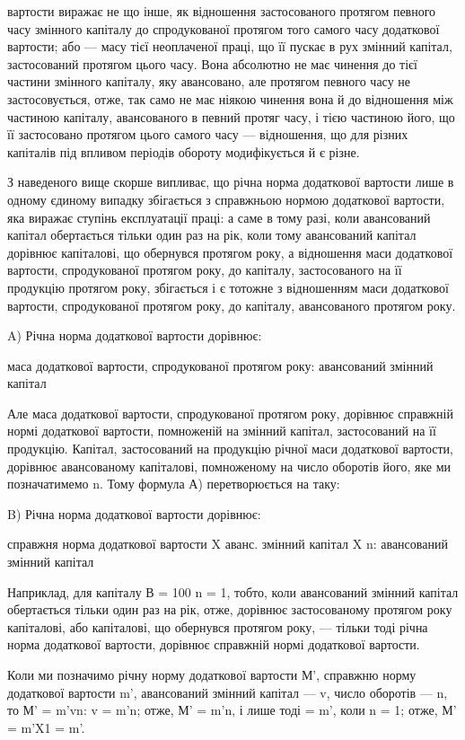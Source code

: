 вартости виражає не що інше, як відношення застосованого протягом
певного часу змінного капіталу до спродукованої протягом того самого
часу додаткової вартости; або — масу тієї неоплаченої праці, що її пускає
в рух змінний капітал, застосований протягом цього часу. Вона абсолютно
не має чинення до тієї частини змінного капіталу, яку авансовано,
але протягом певного часу не застосовується, отже, так само не
має ніякою чинення вона й до відношення між частиною капіталу, авансованого
в певний протяг часу, і тією частиною його, що її застосовано
протягом цього самого часу — відношення, що для різних капіталів
під впливом періодів обороту модифікується й є різне.

З наведеного вище скорше випливає, що річна норма додаткової вартости
лише в одному єдиному випадку збігається з справжньою нормою
додаткової вартости, яка виражає ступінь експлуатації праці: а саме в
тому разі, коли авансований капітал обертається тільки один раз на рік,
коли тому авансований капітал дорівнює капіталові, що обернувся протягом
року, а відношення маси додаткової вартости, спродукованої протягом
року, до капіталу, застосованого на її продукцію протягом року, збігається
і є тотожне з відношенням маси додаткової вартости, спродукованої
протягом року, до капіталу, авансованого протягом року.

A) Річна норма додаткової вартости дорівнює:

маса додаткової вартости, спродукованої протягом року: авансований змінний капітал

Але маса додаткової вартости, спродукованої протягом року, дорівнює
справжній нормі додаткової вартости, помноженій на змінний капітал,
застосований на її продукцію. Капітал, застосований на продукцію
річної маси додаткової вартости, дорівнює авансованому капіталові, помноженому
на число оборотів його, яке ми позначатимемо n. Тому формула А) перетворюється на таку:

B) Річна норма додаткової вартости дорівнює:

справжня норма додаткової вартости X аванс. змінний капітал X n: авансований змінний капітал

Наприклад, для капіталу В = 100%
n = 1, тобто, коли авансований змінний капітал обертається тільки
один раз на рік, отже, дорівнює застосованому протягом року капіталові,
або капіталові, що обернувся протягом року, — тільки тоді річна норма додаткової
вартости, дорівнює справжній нормі додаткової вартости.

Коли ми позначимо річну норму додаткової вартости М', справжню норму
додаткової вартости m', авансований змінний капітал — v, число оборотів
— n, то М' = m'vn: v = m'n; отже, М' = m'n, і лише тоді = m', коли
n = 1; отже, М' = m'X1 = m'.
